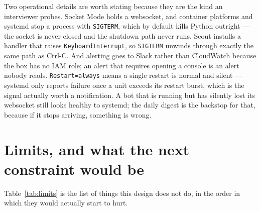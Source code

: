 \documentclass[11pt,a4paper]{article}
\begin{document}
Two operational details are worth stating because they are the kind an interviewer probes.
Socket Mode holds a websocket, and container platforms and systemd stop a process with
\texttt{SIGTERM}, which by default kills Python outright --- the socket is never closed and
the shutdown path never runs. Scout installs a handler that raises
\texttt{KeyboardInterrupt}, so \texttt{SIGTERM} unwinds through exactly the same path as
Ctrl-C. And alerting goes to Slack rather than CloudWatch because the box has no IAM role;
an alert that requires opening a console is an alert nobody reads. \texttt{Restart=always}
means a single restart is normal and silent --- systemd only reports failure once a unit
exceeds its restart burst, which is the signal actually worth a notification. A bot that is
running but has silently lost its websocket still looks healthy to systemd; the daily digest
is the backstop for that, because if it stops arriving, something is wrong.

\section{Limits, and what the next constraint would be}

Table~\ref{tab:limits} is the list of things this design does not do, in the order in which
they would actually start to hurt.
\end{document}
